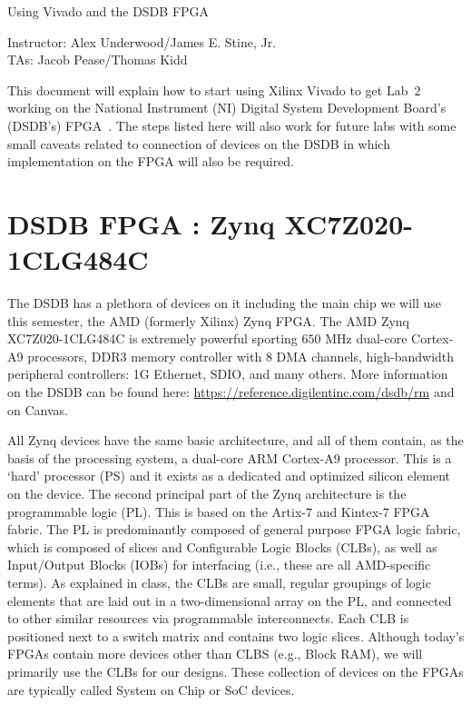 \documentclass{article}
\newcommand{\myassignment}{Using Vivado and the DSDB FPGA}
\newcommand{\myinstructor}{Instructor: Alex Underwood/James E. Stine, Jr.}
\newcommand{\mytas}{TAs: Jacob Pease/Thomas Kidd}
\begin{document}
\begin{center}
  {\huge \myassignment} \\
  \begin{flushright}
    \myinstructor \\
    \mytas \\
  \end{flushright}
\end{center}

This document will explain how to start using Xilinx Vivado to get Lab~$2$
working on the National Instrument (NI) Digital System Development
Board's (DSDB's) FPGA~\cite{dsdb1}.  The steps listed here will also work for
future labs with some small caveats related to connection of devices
on the DSDB in which implementation on the FPGA will also be required.

\section{DSDB FPGA : Zynq XC7Z020-1CLG484C}

The DSDB has a plethora of devices on it including the main chip we
will use this semester, the AMD (formerly Xilinx) Zynq FPGA.  The AMD Zynq
XC7Z020-1CLG484C is extremely powerful sporting  $650$ MHz
dual-core Cortex-A9 processors,  DDR3 memory controller with $8$ DMA
channels,  high-bandwidth peripheral controllers: 1G Ethernet, SDIO,
and many others.  More information on the DSDB can be found here:
\url{https://reference.digilentinc.com/dsdb/rm} and on Canvas.

All Zynq devices have the same basic architecture, and all of them
contain, as the basis of
the processing system, a dual-core ARM Cortex-A9 processor. This is a
‘hard’ processor (PS) and
it exists as a dedicated and optimized silicon element on the device.
The second principal part of the Zynq architecture is the programmable
logic (PL). This is
based on the Artix\textsuperscript{\textregistered}-$7$ and
Kintex\textsuperscript{\textregistered}-$7$ FPGA fabric.
The PL is predominantly composed of general purpose FPGA logic fabric,
which is composed of slices and Configurable Logic Blocks (CLBs), as
well as Input/Output Blocks (IOBs) for interfacing 
(i.e., these are all AMD-specific terms).   As explained in class,
the CLBs are small, regular groupings of logic
elements that are laid out in a two-dimensional array on the PL, and
connected to
other similar resources via programmable interconnects.
Each CLB is positioned
next to a switch matrix and contains two logic slices.  Although
today's FPGAs contain more devices other than CLBS (e.g., Block RAM),
we will primarily use the CLBs for our designs.  These collection of
devices on the FPGAs are typically called System on Chip or SoC devices.
\end{document}
